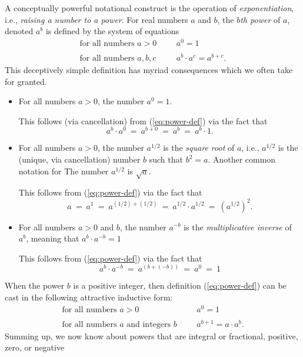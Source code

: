 A conceptually powerful notational construct is the operation of {\it
  exponentiation}, 
i.e., {\it raising a number to a power}.
For real numbers $a$ and $b$, the {\it $b$th power} of $a$, denoted
$a^b$ is defined by the system of equations
\begin{equation}
\label{eq:power-def}
\begin{array}{llll}
\mbox{for all numbers $a>0$} & & & a^0 = 1 \\
 & & & \\
\mbox{for all numbers $a, b, c$} & & & a^b \cdot a^c = a^{b+c}.
\end{array}
\end{equation}
This deceptively simple definition has myriad consequences which we
often take for granted.
\begin{itemize}
\item
For all numbers $a>0$, the number $a^0 = 1$.

This follows (via cancellation) from (\ref{eq:power-def}) via the fact
that
\[ a^b \cdot a^0 \ = \ a^{b+0} \ = \ a^b \ = \ a^b \cdot 1.  \]

\item
For all numbers $a >0$, the number $a^{1/2}$
is the {\it square root} of $a$,
i.e., $a^{1/2}$ is the (unique, via cancellation) number $b$ such that
$b^2 = a$.  Another common notation for The number $a^{1/2}$ is
$\sqrt{a}$.

This follows from (\ref{eq:power-def}) via the fact that
\[ a \ = \ a^1 \ = \ a^{(1/2) + (1/2)} \ = \ a^{1/2} \cdot a^{1/2} \ = \
\left(a^{1/2}\right)^2. \]

\item
For all numbers $a>0$ and $b$, the number $a^{-b}$ is the {\it
  multiplicative inverse}
of $a^b$, meaning that $a^b \cdot a^{-b} = 1$

This follows from (\ref{eq:power-def}) via the fact that
\[ a^b \cdot a^{-b} \ = \ a^{(b + (-b))} \ = \ a^0 \ = \  1 \]
\end{itemize}
When the power $b$ is a positive integer, then definition
(\ref{eq:power-def}) can be cast in the following attractive inductive
form:
\begin{equation}
\label{eq:power-def-integer}
\begin{array}{llll}
\mbox{for all numbers $a>0$} & & & a^0 = 1 \\
 & & & \\
\mbox{for all numbers $a$ and integers $b$} & & & a^{b+1} = a \cdot
a^b.
\end{array}
\end{equation}
Summing up, we now know about powers that are integral or fractional,
positive, zero, or negative

